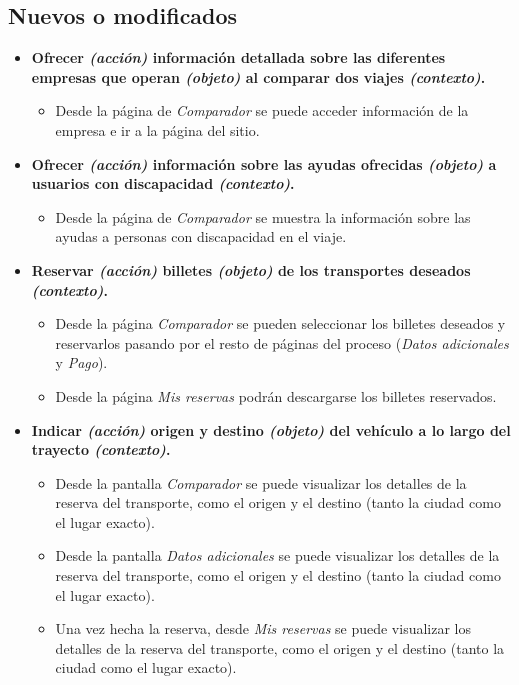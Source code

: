 \subsection*{Nuevos o modificados}

\begin{itemize}
    \item \textbf{Ofrecer \textit{(acción)} información detallada sobre las diferentes empresas que operan
        \textit{(objeto)} al comparar dos viajes \textit{(contexto)}.}
        \begin{itemize}
            \item Desde la página de \textit{Comparador} se puede acceder información de la empresa e
                ir a la página del sitio.
        \end{itemize}
    
    \item \textbf{Ofrecer \textit{(acción)} información sobre las ayudas ofrecidas \textit{(objeto)} a usuarios 
        con discapacidad \textit{(contexto)}.}
        \begin{itemize}
            \item Desde la página de \textit{Comparador} se muestra la información sobre las ayudas a personas
                con discapacidad en el viaje.
        \end{itemize}
    
    \item \textbf{Reservar \textit{(acción)} billetes \textit{(objeto)} de los transportes deseados \textit{(contexto)}.} 
        \begin{itemize}
            \item Desde la página \textit{Comparador} se pueden seleccionar los billetes deseados y reservarlos pasando por el 
                resto de páginas del proceso (\textit{Datos adicionales} y \textit{Pago}).
            \item Desde la página \textit{Mis reservas} podrán descargarse los billetes reservados.
        \end{itemize}

    \item \textbf{Indicar \textit{(acción)} origen y destino \textit{(objeto)} del vehículo a lo largo del trayecto
        \textit{(contexto)}.}
        \begin{itemize}
            \item Desde la pantalla \textit{Comparador} se puede visualizar los detalles de la reserva del transporte, como el origen y el destino (tanto
                la ciudad como el lugar exacto).
            \item Desde la pantalla \textit{Datos adicionales} se puede visualizar los detalles de la reserva del transporte, como el origen y el destino (tanto
                la ciudad como el lugar exacto).
            \item Una vez hecha la reserva, desde \textit{Mis reservas} se puede visualizar los detalles de la reserva del transporte, como el origen y el destino (tanto
                la ciudad como el lugar exacto).
        \end{itemize}


\end{itemize}

